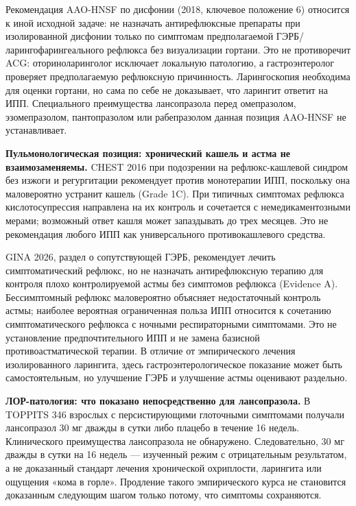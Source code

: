 \documentclass[11pt,a4paper,notitlepage]{report}
\newcommand{\src}[1]{\unskip\space\cite{#1}}
\begin{document}
Рекомендация AAO-HNSF по дисфонии (2018, ключевое положение 6) относится к иной исходной задаче: не назначать антирефлюксные препараты при изолированной дисфонии только по симптомам предполагаемой ГЭРБ/ларингофарингеального рефлюкса без визуализации гортани. Это не противоречит ACG: оториноларинголог исключает локальную патологию, а гастроэнтеролог проверяет предполагаемую рефлюксную причинность. Ларингоскопия необходима для оценки гортани, но сама по себе не доказывает, что ларингит ответит на ИПП. Специального преимущества лансопразола перед омепразолом, эзомепразолом, пантопразолом или рабепразолом данная позиция AAO-HNSF не устанавливает.\src{aao2018,acggerd}

\textbf{Пульмонологическая позиция: хронический кашель и астма не взаимозаменяемы.} CHEST 2016 при подозрении на рефлюкс-кашлевой синдром без изжоги и регургитации рекомендует против монотерапии ИПП, поскольку она маловероятно устранит кашель (Grade 1C). При типичных симптомах рефлюкса кислотосупрессия направлена на их контроль и сочетается с немедикаментозными мерами; возможный ответ кашля может запаздывать до трех месяцев. Это не рекомендация любого ИПП как универсального противокашлевого средства.\src{chestcough2016}

GINA 2026, раздел о сопутствующей ГЭРБ, рекомендует лечить симптоматический рефлюкс, но не назначать антирефлюксную терапию для контроля плохо контролируемой астмы без симптомов рефлюкса (Evidence A). Бессимптомный рефлюкс маловероятно объясняет недостаточный контроль астмы; наиболее вероятная ограниченная польза ИПП относится к сочетанию симптоматического рефлюкса с ночными респираторными симптомами. Это не установление предпочтительного ИПП и не замена базисной противоастматической терапии. В отличие от эмпирического лечения изолированного ларингита, здесь гастроэнтерологическое показание может быть самостоятельным, но улучшение ГЭРБ и улучшение астмы оценивают раздельно.\src{gina2026}

\textbf{ЛОР-патология: что показано непосредственно для лансопразола.} В TOPPITS 346 взрослых с персистирующими глоточными симптомами получали лансопразол 30 мг дважды в сутки либо плацебо в течение 16 недель. Клинического преимущества лансопразола не обнаружено. Следовательно, 30 мг дважды в сутки на 16 недель --- изученный режим с отрицательным результатом, а не доказанный стандарт лечения хронической охриплости, ларингита или ощущения «кома в горле». Продление такого эмпирического курса не становится доказанным следующим шагом только потому, что симптомы сохраняются.\src{toppits}
\end{document}
